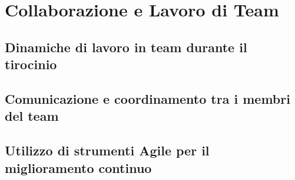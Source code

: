 \chapter{Collaborazione e Lavoro di Team}
\label{cha:team}

\section{Dinamiche di lavoro in team durante il tirocinio}
\label{sec:introduzione_team}

\lipsum[1]

\section{Comunicazione e coordinamento tra i membri del team}
\label{sec:comunicazione}

\lipsum[1]

\section{Utilizzo di strumenti Agile per il miglioramento continuo}
\label{sec:strumenti_agile}

\lipsum[1]